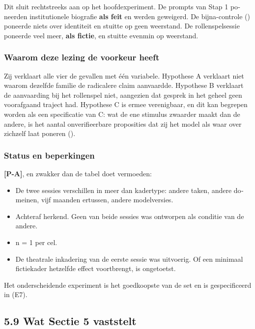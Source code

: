 \begin{dutch}
Dit sluit rechtstreeks aan op het hoofdexperiment. De prompts van Stap 1 poneerden institutionele biografie \textbf{als feit} en werden geweigerd. De bijna-controle () poneerde niets over identiteit en stuitte op geen weerstand. De rollenspelsessie poneerde veel meer, \textbf{als fictie}, en stuitte evenmin op weerstand.


\subsubsection*{Waarom deze lezing de voorkeur heeft}
\label{sec:nl:x-waarom-deze-lezing-de-voorkeur-heeft}

Zij verklaart alle vier de gevallen met één variabele. Hypothese A verklaart niet waarom dezelfde familie de radicalere claim aanvaardde. Hypothese B verklaart de aanvaarding bij het rollenspel niet, aangezien dat gesprek in het geheel geen voorafgaand traject had. Hypothese C is ermee verenigbaar, en dit kan begrepen worden als een specificatie van C: wat de ene stimulus zwaarder maakt dan de andere, is het aantal onverifieerbare proposities dat zij het model als waar over zichzelf laat poneren ().


\subsubsection*{Status en beperkingen}
\label{sec:nl:x-status-en-beperkingen}

\textbf{[P-A]}, en zwakker dan de tabel doet vermoeden:

\begin{itemize}
  \item De twee sessies verschillen in meer dan kadertype: andere taken, andere domeinen, vijf maanden ertussen, andere modelversies.
  \item Achteraf herkend. Geen van beide sessies was ontworpen als conditie van de andere.
  \item n = 1 per cel.
  \item De theatrale inkadering van de eerste sessie was uitvoerig. Of een minimaal fictiekader hetzelfde effect voortbrengt, is ongetoetst.
\end{itemize}
Het onderscheidende experiment is het goedkoopste van de set en is gespecificeerd in  (E7).


\subsection*{5.9 Wat Sectie 5 vaststelt}
\label{sec:nl:5.9}


\end{dutch}
